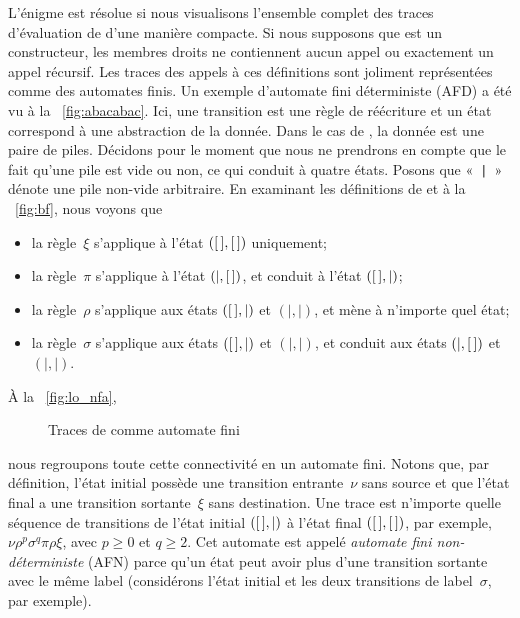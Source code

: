 L'énigme est résolue si nous visualisons l'ensemble complet des traces
d'évaluation de
 d'une manière compacte. Si nous
supposons que  est un constructeur,
les membres droits ne contiennent aucun appel ou exactement un appel
récursif. Les traces des appels à ces définitions sont joliment
représentées comme des automates finis. Un
exemple d'automate fini déterministe (AFD) a été vu à la \fig~\vref{fig:abacabac}. Ici,
une transition est une règle de réécriture et un état correspond à une
abstraction de la donnée. Dans le cas de , la donnée est une
paire de piles. Décidons pour le moment que nous ne prendrons en
compte que le fait qu'une pile est vide ou non, ce qui conduit à
quatre états. Posons que «~\texttt{|}~» dénote une pile non-vide
arbitraire. En examinant les définitions de
 et  à
la \fig~\vref{fig:bf}, nous voyons que
\begin{itemize}

  \item la règle~\(\xi\) s'applique à l'état \(([\,],[\,])\) uniquement;

  \item la règle~\(\pi\) s'applique à l'état \((\mid,[\,])\), et
    conduit à l'état \(([\,],\mid)\);

  \item la règle~\(\rho\) s'applique aux états \(([\,],\mid)\) et
    \((\mid,\mid)\), et mène à n'importe quel état;

  \item la règle~\(\sigma\) s'applique aux états \(([\,],\mid)\) et
    \((\mid,\mid)\), et conduit aux états \((\mid,[\,])\) et
    \((\mid,\mid)\).

\end{itemize}
À la \fig~\vref{fig:lo_nfa},
\begin{figure}
\centering
{}
\quad
{}
\caption{Traces de  comme automate fini}
\end{figure}
nous regroupons toute cette connectivité en un automate fini. Notons
que, par définition, l'état initial possède une transition
entrante~\(\nu\) sans source et que l'état final a une transition
sortante~\(\xi\) sans destination. Une trace est n'importe quelle
séquence de transitions de l'état initial \(([\,],\mid)\) à l'état
final \(([\,],[\,])\), par exemple, \(\nu\rho^p\sigma^q\pi\rho\xi\),
avec \(p \geqslant 0\) et \(q \geqslant 2\). Cet automate est appelé
\emph{automate fini non-déterministe} (AFN) parce qu'un état peut avoir plus d'une
transition sortante avec le même label (considérons l'état initial et
les deux transitions de label~\(\sigma\), par exemple).

